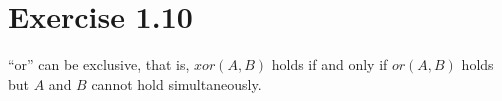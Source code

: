 \section*{Exercise 1.10}

``or'' can be exclusive, that is, $xor(A,B)$ holds if and only if
$or(A,B)$ holds but $A$ and $B$ cannot hold simultaneously. 
